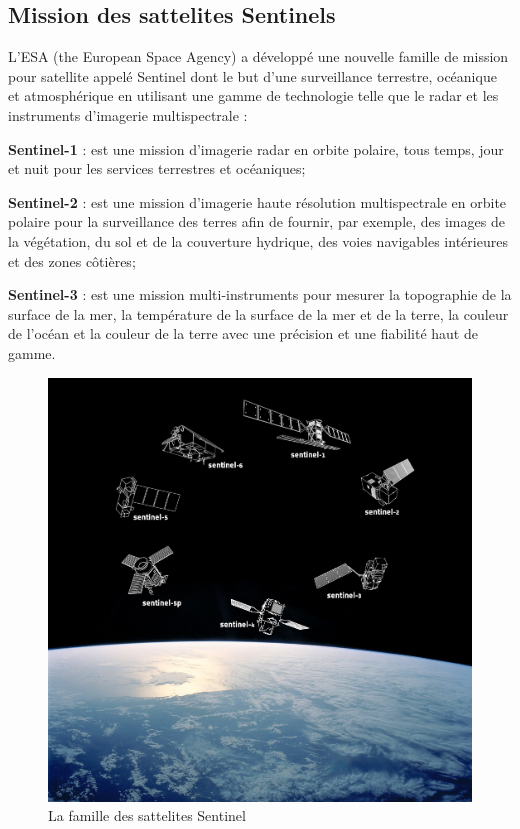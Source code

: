 \documentclass[12pt, openany]{report}
\begin{document}
\subsection{Mission des sattelites Sentinels}
L'ESA (the European Space Agency) a développé une nouvelle famille de mission pour satellite appelé Sentinel dont le but d'une surveillance terrestre, océanique et atmosphérique en utilisant une gamme de technologie telle que le radar et les instruments d'imagerie multispectrale :
\begin{mylist}
\item \textbf{Sentinel-1} : est une mission d'imagerie radar en orbite polaire, tous temps, jour et nuit pour les services terrestres et océaniques;
\item \textbf{Sentinel-2} : est une mission d'imagerie haute résolution multispectrale en orbite polaire pour la surveillance des terres afin de fournir, par exemple, des images de la végétation, du sol et de la couverture hydrique, des voies navigables intérieures et des zones côtières;
\item \textbf{Sentinel-3} : est une mission multi-instruments pour mesurer la topographie de la surface de la mer, la température de la surface de la mer et de la terre, la couleur de l'océan et la couleur de la terre avec une précision et une fiabilité haut de gamme.\cite{sentinel}

\begin{figure}[H]
\centering
\includegraphics[scale=0.33]{Sentinel_family.jpg}
\caption{La famille des sattelites Sentinel}
\end{figure}

\end{mylist}
\end{document}
